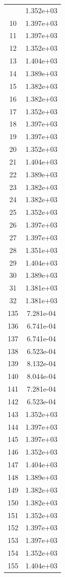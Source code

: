 \documentclass[12pt]{article}
\begin{document}
\begin{longtable}{@{}cc@{}}
\bottomrule
\endlastfoot
9 & 1.352e+03 \\
10 & 1.397e+03 \\
11 & 1.397e+03 \\
12 & 1.352e+03 \\
13 & 1.404e+03 \\
14 & 1.389e+03 \\
15 & 1.382e+03 \\
16 & 1.382e+03 \\
17 & 1.352e+03 \\
18 & 1.397e+03 \\
19 & 1.397e+03 \\
20 & 1.352e+03 \\
21 & 1.404e+03 \\
22 & 1.389e+03 \\
23 & 1.382e+03 \\
24 & 1.382e+03 \\
25 & 1.352e+03 \\
26 & 1.397e+03 \\
27 & 1.397e+03 \\
28 & 1.351e+03 \\
29 & 1.404e+03 \\
30 & 1.389e+03 \\
31 & 1.381e+03 \\
32 & 1.381e+03 \\
135 & 7.281e-04 \\
136 & 6.741e-04 \\
137 & 6.741e-04 \\
138 & 6.523e-04 \\
139 & 8.132e-04 \\
140 & 8.044e-04 \\
141 & 7.281e-04 \\
142 & 6.523e-04 \\
143 & 1.352e+03 \\
144 & 1.397e+03 \\
145 & 1.397e+03 \\
146 & 1.352e+03 \\
147 & 1.404e+03 \\
148 & 1.389e+03 \\
149 & 1.382e+03 \\
150 & 1.382e+03 \\
151 & 1.352e+03 \\
152 & 1.397e+03 \\
153 & 1.397e+03 \\
154 & 1.352e+03 \\
155 & 1.404e+03 \\

\end{longtable}
\end{document}
